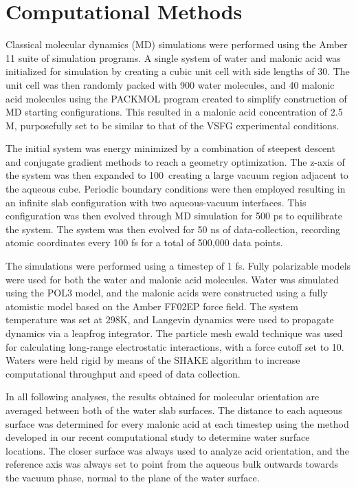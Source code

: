 \section {Computational Methods}

Classical molecular dynamics (MD) simulations were performed using the Amber 11 suite of simulation programs.\cite{Case2010,Pearlman1995} A single system of water and malonic acid was initialized for simulation by creating a cubic unit cell with side lengths of 30\angs. The unit cell was then randomly packed with 900 water molecules, and 40 malonic acid molecules using the PACKMOL program created to simplify construction of MD starting configurations.\cite{Martinez2009} This resulted in a malonic acid concentration of 2.5 M, purposefully set to be similar to that of the VSFG experimental conditions.

The initial system was energy minimized by a combination of steepest descent and conjugate gradient methods to reach a geometry optimization. The z-axis of the system was then expanded to 100\angs~creating a large vacuum region adjacent to the aqueous cube. Periodic boundary conditions were then employed resulting in an infinite slab configuration with two aqueous-vacuum interfaces. This configuration was then evolved through MD simulation for 500 ps to equilibrate the system. The system was then evolved for 50 ns of data-collection, recording atomic coordinates every 100 fs for a total of 500,000 data points.

The simulations were performed using a timestep of 1 fs. Fully polarizable models were used for both the water and malonic acid molecules. Water was simulated using the POL3 model,\cite{Caldwell1995} and the malonic acids were constructed using a fully atomistic model based on the Amber FF02EP force field.\cite{Case2005} The system temperature was set at 298K, and Langevin dynamics were used to propagate dynamics via a leapfrog integrator. The particle mesh ewald technique was used for calculating long-range electrostatic interactions, with a force cutoff set to 10\angs. Waters were held rigid by means of the SHAKE algorithm to increase computational throughput and speed of data collection.

In all following analyses, the results obtained for molecular orientation are averaged between both of the water slab surfaces. The distance to each aqueous surface was determined for every malonic acid at each timestep using the method developed in our recent computational study to determine water surface locations.\cite{Shamay2011} The closer surface was always used to analyze acid orientation, and the reference axis was always set to point from the aqueous bulk outwards towards the vacuum phase, normal to the plane of the water surface.
